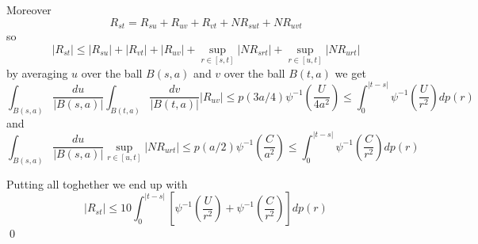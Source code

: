 \documentclass[a4paper,12pt,reqno]{amsproc}
\newcommand{\NN}{N}
\begin{document}
Moreover
$$
R_{st} = R_{s u} + R_{uv} + R_{v t} + \NN R_{sut} + \NN R_{uvt} 
$$
so
$$
|R_{st}| \le |R_{s u}| + |R_{v t}| + |R_{uv}| + \sup_{r \in [s,t]}
|\NN R_{srt}| + \sup_{r \in [u,t]} |\NN R_{urt}|
$$
by averaging $u$ over the ball $B(s,a)$ and $v$ over the ball
$B(t,a)$ we get 
\begin{equation*}
\int_{B(s,a)} \frac{du}{|B(s,a)|} \int_{B(t,a)} \frac{dv}{|B(t,a)|}   |R_{uv}|
\le p(3 a/4)\psi^{-1}\left(\frac{U}{4 a^2}\right) \le \int_0^{|t-s|}
\psi^{-1}\left(\frac{U}{ r^2}\right) dp(r) 
\end{equation*}
and
\begin{equation*}
\int_{B(s,a)} \frac{du}{|B(s,a)|} \sup_{r \in [u,t]} |\NN R_{urt}| \le 
p(a/2)\psi^{-1}\left(\frac{C}{  a^2}\right)  \le
\int_0^{|t-s|} \psi^{-1}\left(\frac{C}{ r^2}\right) dp(r) 
\end{equation*}

Putting all toghether we end up with
\begin{equation*}
 |R_{st}| \le  
10 \int_0^{|t-s|} \left[ \psi^{-1}\left(\frac{U}{ r^2}\right)+
  \psi^{-1}\left(\frac{C}{ r^2}\right)\right]   dp(r)
\end{equation*}
\qed
\end{document}
